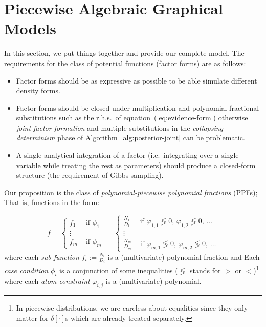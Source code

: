 \documentclass[letterpaper]{article}
\newcommand{\case}[2]{#2 &\text{ if } #1}%
\begin{document}
\section{Piecewise Algebraic Graphical Models}
In this section, we put things together and provide our complete model.
The requirements for the class of potential functions (factor forms) are as follows:
\begin{itemize}
\item Factor forms should be as expressive as possible to be able simulate different density forms.  
\item Factor forms should be closed under multiplication and polynomial fractional substitutions such as 
the r.h.s.\ of equation~(\ref{eq:evidence-form}) otherwise \emph{joint factor formation} and multiple substitutions in the \emph{collapsing determinism} phase of 
Algorithm~\ref{alg:posterior-joint} can be problematic.
\item A single analytical integration of a factor (i.e.\ integrating over a single variable while treating the rest as parameters) should produce a closed-form structure (the requirement of Gibbs sampling).
\end{itemize}   

Our proposition is the class of \emph{polynomial-piecewise polynomial fractions} (PPFs); That is,   
functions in the form:

\begin{equation}
\label{e:ppf}
f = 
  \begin{cases}
  \case{\phi_1}{f_1}\\
\vdots\\
  \case{\phi_m}{f_m}    
  \end{cases}
\!\!\!=
  \begin{cases}
  \case{\varphi_{1,1} \lessgtr 0,\, \varphi_{1,2} \lessgtr 0,\, \ldots}{\frac{N_1}{D_1}} \\
\vdots\\
   \case{\varphi_{m,1} \lessgtr 0,\, \varphi_{m,2} \lessgtr 0,\, \ldots}{\frac{N_m}{D_m}}    
  \end{cases}
\end{equation}
where each \emph{sub-function} $f_i := \frac{N_i}{D_i}$ is a (multivariate) polynomial fraction and 
Each \emph{case condition} $\phi_i$ is a conjunction of some inequalities ($\lessgtr$ stands for  
$>$ or $<$)\footnote{In piecewise distributions,  
we are careless about equalities since they only matter for $\delta[\cdot]$s which are already treated separately.} 
where each \emph{atom constraint} $\varphi_{i,j}$ is a (multivariate) polynomial.
\end{document}
